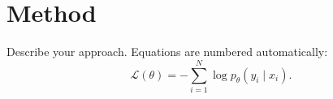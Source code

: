 \section{Method}
\label{sec:method}

Describe your approach. Equations are numbered automatically:
\begin{equation}
  \mathcal{L}(\theta) = -\sum_{i=1}^{N} \log p_\theta(y_i \mid x_i).
  \label{eq:loss}
\end{equation}
